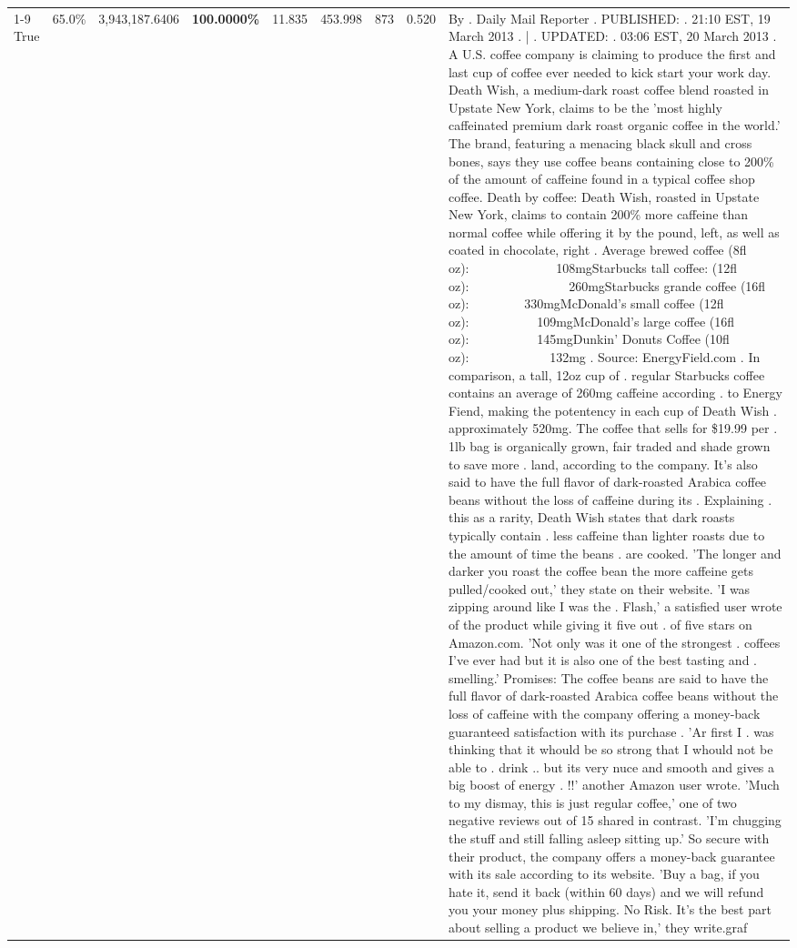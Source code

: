 \begin{table}[H]
{\begin{tabular}{lllrlllll}
\cline{1-9}
True & 65.0\% & 3,943,187.6406 & \bfseries \color{red} 100.0000\% & 11.835 & 453.998 & 873 & 0.520 & By . Daily Mail Reporter . PUBLISHED: . 21:10 EST, 19 March 2013 . | . UPDATED: . 03:06 EST, 20 March 2013 . A U.S. coffee company is claiming to produce the first and last cup of coffee ever needed to kick start your work day. Death Wish, a medium-dark roast coffee blend roasted in Upstate New York, claims to be the 'most highly caffeinated premium dark roast organic coffee in the world.' The brand, featuring a menacing black skull and cross bones, says they use coffee beans containing close to 200\% of the amount of caffeine found in a typical coffee shop coffee. Death by coffee: Death Wish, roasted in Upstate New York, claims to contain 200\% more caffeine than normal coffee while offering it by the pound, left, as well as coated in chocolate, right . Average brewed coffee (8fl oz):              108mgStarbucks tall coffee: (12fl oz):                260mgStarbucks grande coffee (16fl oz):         330mgMcDonald's small coffee (12fl oz):           109mgMcDonald's large coffee (16fl oz):           145mgDunkin' Donuts Coffee (10fl oz):             132mg . Source: EnergyField.com . In comparison, a tall, 12oz cup of . regular Starbucks coffee contains an average of 260mg caffeine according . to Energy Fiend, making the potentency in each cup of Death Wish . approximately 520mg. The coffee that sells for \$19.99 per . 1lb bag is organically grown, fair traded and shade grown to save more . land, according to the company. It's also said to have the full flavor of dark-roasted Arabica coffee beans without the loss of caffeine during its . Explaining . this as a rarity, Death Wish states that dark roasts typically contain . less caffeine than lighter roasts due to the amount of time the beans . are cooked. 'The longer and darker you roast the coffee bean the more caffeine gets pulled/cooked out,' they state on their website. 'I was zipping around like I was the . Flash,' a satisfied user wrote of the product while giving it five out . of five stars on Amazon.com. 'Not only was it one of the strongest . coffees I've ever had but it is also one of the best tasting and . smelling.’ Promises: The coffee beans are said to have the full flavor of dark-roasted Arabica coffee beans without the loss of caffeine with the company offering a money-back guaranteed satisfaction with its purchase . 'Ar first I . was thinking that it whould be so strong that I whould not be able to . drink .. but its very nuce and smooth and gives a big boost of energy . !!' another Amazon user wrote. 'Much to my dismay, this is just regular coffee,' one of two negative reviews out of 15 shared in contrast. 'I'm chugging the stuff and still falling asleep sitting up.' So secure with their product, the company offers a money-back guarantee with its sale according to its website. 'Buy a bag, if you hate it, send it back (within 60 days) and we will refund you your money plus shipping. No Risk. It’s the best part about selling a product we believe in,' they write.graf \\

\end{tabular}}
\end{table}
